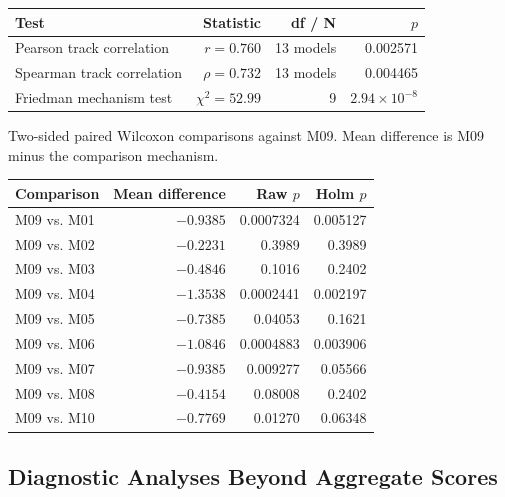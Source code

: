 \begin{SuppTable}
\caption{Complete inferential tests. Correlations use 13 model means. The
Friedman and Wilcoxon tests use 13 model-level blocks, with each mechanism
represented by a mean over ten domains.}
\label{tab:supp-tests}
\centering
\small
{}
\begin{tabularx}{0.82\textwidth}{Xrrr}
\toprule
\rowcolor{supphead}
Test & Statistic & df / N & $p$\\
\midrule
Pearson track correlation & $r=0.760$ & 13 models & 0.002571\\
Spearman track correlation & $\rho=0.732$ & 13 models & 0.004465\\
Friedman mechanism test & $\chi^2=52.99$ & 9 & $2.94\times10^{-8}$\\
\bottomrule
\end{tabularx}
\vspace{6pt}
\parbox{0.78\textwidth}{\centering\small Two-sided paired Wilcoxon comparisons
against M09. Mean difference is M09 minus the comparison mechanism.}\par\smallskip
{}
\begin{tabularx}{0.78\textwidth}{Xrrr}
\toprule
\rowcolor{supppurple!15}
Comparison & Mean difference & Raw $p$ & Holm $p$\\
\midrule
M09 vs. M01 & $-0.9385$ & 0.0007324 & 0.005127\\
M09 vs. M02 & $-0.2231$ & 0.3989 & 0.3989\\
M09 vs. M03 & $-0.4846$ & 0.1016 & 0.2402\\
M09 vs. M04 & $-1.3538$ & 0.0002441 & 0.002197\\
M09 vs. M05 & $-0.7385$ & 0.04053 & 0.1621\\
M09 vs. M06 & $-1.0846$ & 0.0004883 & 0.003906\\
M09 vs. M07 & $-0.9385$ & 0.009277 & 0.05566\\
M09 vs. M08 & $-0.4154$ & 0.08008 & 0.2402\\
M09 vs. M10 & $-0.7769$ & 0.01270 & 0.06348\\
\bottomrule
\end{tabularx}
\end{SuppTable}

\subsection{Diagnostic Analyses Beyond Aggregate Scores}



